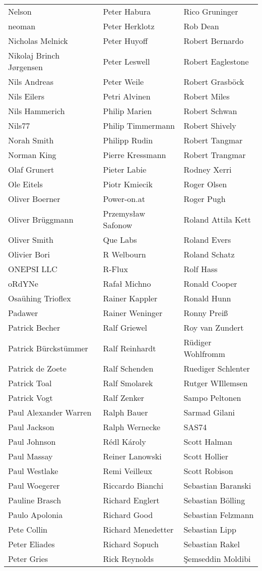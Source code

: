 \begin{tabular}{p{4.5cm}p{4.5cm}p{4.5cm}}
Nelson & Peter Habura & Rico Gruninger \\
neoman & Peter Herklotz & Rob Dean \\
Nicholas Melnick & Peter Huyoff & Robert Bernardo \\
Nikolaj Brinch Jørgensen & Peter Leswell & Robert Eaglestone \\
Nils Andreas & Peter Weile & Robert Grasböck \\
Nils Eilers & Petri Alvinen & Robert Miles \\
Nils Hammerich & Philip Marien & Robert Schwan \\
Nils77 & Philip Timmermann & Robert Shively \\
Norah Smith & Philipp Rudin & Robert Tangmar \\
Norman King & Pierre Kressmann & Robert Trangmar \\
Olaf Grunert & Pieter Labie & Rodney Xerri \\
Ole Eitels & Piotr Kmiecik & Roger Olsen \\
Oliver Boerner & Power-on.at & Roger Pugh \\
Oliver Brüggmann & Przemysław Safonow & Roland Attila Kett \\
Oliver Smith & Que Labs & Roland Evers \\
Olivier Bori & R Welbourn & Roland Schatz \\
ONEPSI LLC & R-Flux & Rolf Hass \\
oRdYNe & Rafał Michno & Ronald Cooper \\
Osaühing Trioflex & Rainer Kappler & Ronald Hunn \\
Padawer & Rainer Weninger & Ronny Preiß \\
Patrick Becher & Ralf Griewel & Roy van Zundert \\
Patrick Bürckstümmer & Ralf Reinhardt & Rüdiger Wohlfromm \\
Patrick de Zoete & Ralf Schenden & Ruediger Schlenter \\
Patrick Toal & Ralf Smolarek & Rutger WIllemsen \\
Patrick Vogt & Ralf Zenker & Sampo Peltonen \\
Paul Alexander Warren & Ralph Bauer & Sarmad Gilani \\
Paul Jackson & Ralph Wernecke & SAS74 \\
Paul Johnson & Rédl Károly & Scott Halman \\
Paul Massay & Reiner Lanowski & Scott Hollier \\
Paul Westlake & Remi Veilleux & Scott Robison \\
Paul Woegerer & Riccardo Bianchi & Sebastian Baranski \\
Pauline Brasch & Richard Englert & Sebastian Bölling \\
Paulo Apolonia & Richard Good & Sebastian Felzmann \\
Pete Collin & Richard Menedetter & Sebastian Lipp \\
Peter Eliades & Richard Sopuch & Sebastian Rakel \\
Peter Gries & Rick Reynolds & Şemseddin Moldibi \\
\end{tabular}
